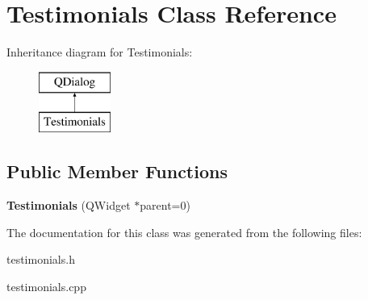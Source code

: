 \hypertarget{class_testimonials}{}\section{Testimonials Class Reference}
\label{class_testimonials}
Inheritance diagram for Testimonials\+:\begin{figure}[H]
\begin{center}
\leavevmode
\includegraphics[height=2.000000cm]{class_testimonials}
\end{center}
\end{figure}
\subsection*{Public Member Functions}
\begin{DoxyCompactItemize}
\item 
\mbox{\label{class_testimonials_a7fd3351a059293a49dc50907b1e1ab04}} 
{\bfseries Testimonials} (Q\+Widget $\ast$parent=0)
\end{DoxyCompactItemize}


The documentation for this class was generated from the following files\+:\begin{DoxyCompactItemize}
\item 
testimonials.\+h\item 
testimonials.\+cpp\end{DoxyCompactItemize}
